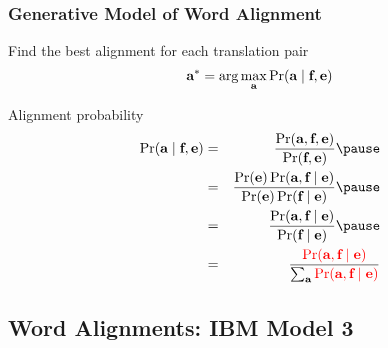 \begin{frame}
\frametitle{Generative Model of Word Alignment}
\begin{block}{Find the best alignment for each translation pair}
\[ \textbf{a}^\ast = \arg\max_{\textbf{a}} \Pr(\textbf{a} \mid \textbf{f}, \textbf{e}) \]
\end{block}\pause
\begin{block}{Alignment probability}
\begin{eqnarray*}
\Pr(\aln \mid \src, \tgt) &=& \frac{ \Pr( \aln, \src, \tgt ) }{ \Pr(\src, \tgt) }\pause\\
&=& \frac{ \Pr(\tgt) \Pr( \aln, \src \mid \tgt ) }{ \Pr(\tgt) \Pr(\src \mid \tgt) }\pause\\
&=& \frac{ \Pr( \aln, \src \mid \tgt ) }{ \Pr(\src \mid \tgt) }\pause\\
&=&\frac{ \color{red} \Pr( \aln, \src \mid \tgt ) }{ \sum_{\aln} {\color{red} \Pr(\aln, \src \mid \tgt)} }
\end{eqnarray*}
\end{block}
\end{frame}

\subsection{Word Alignments: IBM Model 3}
\frame{\tableofcontents[currentsection]}

